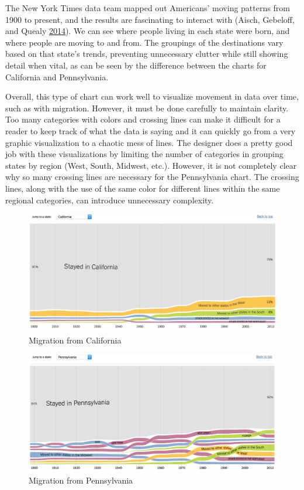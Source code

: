 \documentclass[]{book}
\begin{document}
The New York Times data team mapped out Americans' moving patterns from
1900 to present, and the results are fascinating to interact with
(Aisch, Gebeloff, and Quealy \protect\hyperlink{ref-migration}{2014}).
We can see where people living in each state were born, and where people
are moving to and from. The groupings of the destinations vary based on
that state's trends, preventing unnecessary clutter while still showing
detail when vital, as can be seen by the difference between the charts
for California and Pennsylvania.

Overall, this type of chart can work well to visualize movement in data
over time, such as with migration. However, it must be done carefully to
maintain clarity. Too many categories with colors and crossing lines can
make it difficult for a reader to keep track of what the data is saying
and it can quickly go from a very graphic visualization to a chaotic
mess of lines. The designer does a pretty good job with these
visualizations by limiting the number of categories in grouping states
by region (West, South, Midwest, etc.). However, it is not completely
clear why so many crossing lines are necessary for the Pennsylvania
chart. The crossing lines, along with the use of the same color for
different lines within the same regional categories, can introduce
unnecessary complexity.

\begin{figure}
\centering
\includegraphics{images/CA_migration.png}
\caption{Migration from California}
\end{figure}

\begin{figure}
\centering
\includegraphics{images/PA_migration.png}
\caption{Migration from Pennsylvania}
\end{figure}
\end{document}
